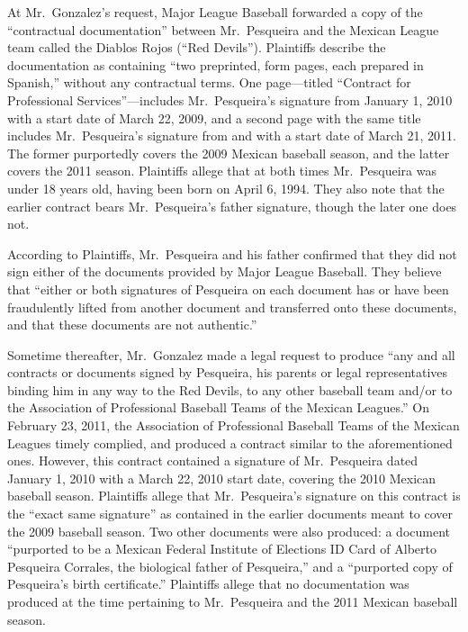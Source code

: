 \documentclass[11pt,letterpaper,twoside]{article}
\begin{document}
At Mr.~Gonzalez's request, Major League Baseball forwarded a copy of the
``contractual documentation'' between Mr.~Pesqueira and the Mexican
League team called the Diablos Rojos (``Red Devils''). Plaintiffs
describe the documentation as containing ``two preprinted, form pages,
each prepared in Spanish,'' without any contractual terms. One
page---titled ``Contract for Professional Services''---includes
Mr.~Pesqueira's signature from January 1, 2010 with a start date of
March 22, 2009, and a second page with the same title includes
Mr.~Pesqueira's signature from and with a start date of March 21, 2011.
The former purportedly covers the 2009 Mexican baseball season, and the
latter covers the 2011 season. Plaintiffs allege that at both times
Mr.~Pesqueira was under 18 years old, having been born on April 6, 1994.
They also note that the earlier contract bears Mr.~Pesqueira's father
signature, though the later one does not.

According to Plaintiffs, Mr.~Pesqueira and his father confirmed that
they did not sign either of the documents provided by Major League
Baseball. They believe that ``either or both signatures of Pesqueira on
each document has or have been fraudulently lifted from another document
and transferred onto these documents, and that these documents are not
authentic.''

Sometime thereafter, Mr.~Gonzalez made a legal request to produce ``any
and all contracts or documents signed by Pesqueira, his parents or legal
representatives binding him in any way to the Red Devils, to any other
baseball team and/or to the Association of Professional Baseball Teams
of the Mexican Leagues.'' On February 23, 2011, the Association of
Professional Baseball Teams of the Mexican Leagues timely complied, and
produced a contract similar to the aforementioned ones. However, this
contract contained a signature of Mr.~Pesqueira dated January 1, 2010
with a March 22, 2010 start date, covering the 2010 Mexican baseball
season. Plaintiffs allege that Mr.~Pesqueira's signature on this
contract is the ``exact same signature'' as contained in the earlier
documents meant to cover the 2009 baseball season. Two other documents
were also produced: a document ``purported to be a Mexican Federal
Institute of Elections ID Card of Alberto Pesqueira Corrales, the
biological father of Pesqueira,'' and a ``purported copy of Pesqueira's
birth certificate.'' Plaintiffs allege that no documentation was
produced at the time pertaining to Mr.~Pesqueira and the 2011 Mexican
baseball season.
\end{document}

